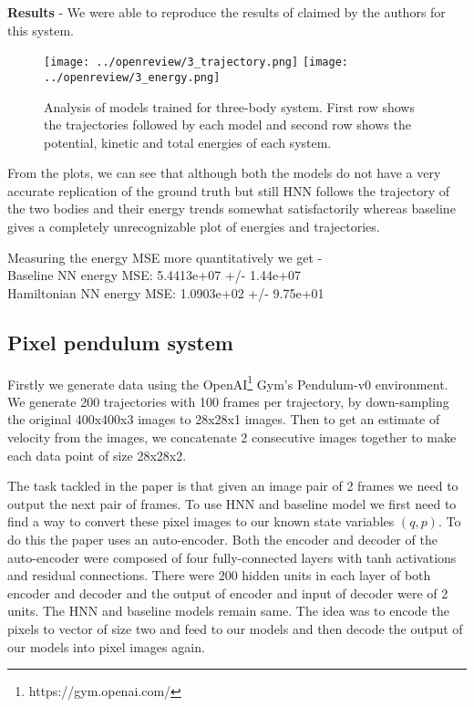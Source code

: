 \textbf{Results} - We were able to reproduce the results of claimed by the authors for this system.
\begin{figure}[htp]
    \centering
    \texttt{[image: ../openreview/3\_trajectory.png]}
    \texttt{[image: ../openreview/3\_energy.png]}
    \caption{Analysis of models trained for three-body system. First row shows the trajectories followed by each model and second row shows the potential, kinetic and total energies of each system.}
    \label{fig:galaxy}
\end{figure}

From the plots, we can see that although both the models do not have a very accurate replication of the ground truth but still HNN follows the trajectory of the two bodies and their energy trends somewhat satisfactorily whereas baseline gives a completely unrecognizable plot of energies and trajectories.

Measuring the energy MSE more quantitatively we get -\\
Baseline NN energy MSE: 5.4413e+07 +/- 1.44e+07\\
Hamiltonian NN energy MSE: 1.0903e+02 +/- 9.75e+01

\subsection{Pixel pendulum system}
Firstly we generate data using the OpenAI\footnote{https://gym.openai.com/} Gym's Pendulum-v0 environment. We generate 200 trajectories with 100 frames per trajectory, by down-sampling the original 400x400x3 images to 28x28x1 images. Then to get an estimate of velocity from the images, we concatenate 2 consecutive images together to make each data point of size 28x28x2. 

The task tackled in the paper is that given an image pair of 2 frames we need to output the next pair of frames. To use HNN and baseline model we first need to find a way to convert these pixel images to our known state variables \((q, p)\). To do this the paper uses an auto-encoder. Both the encoder and decoder of the auto-encoder were composed of four fully-connected layers with tanh activations and residual connections. There were 200 hidden units in each layer of both encoder and decoder and the output of encoder and input of decoder were of 2 units. The HNN and baseline models remain same. The idea was to encode the pixels to vector of size two and feed to our models and then decode the output of our models into pixel images again.

